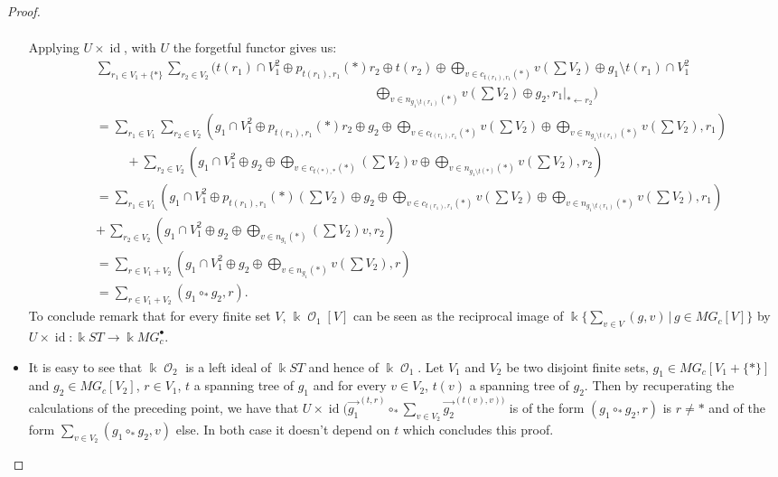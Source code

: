 \documentclass[a4paper]{article}
\DeclareMathOperator{\id}{id}
\DeclareMathOperator{\op}{\mathcal{O}}
\theoremstyle{definition}
\begin{document}
\begin{proof}
\begin{itemize}
\begin{align*}
\end{align*}
Applying $U\times\id$, with $U$ the forgetful functor gives us:
\begin{align*}
&\sum_{r_1\in V_1+\{\ast\}}\sum_{r_2\in V_2} (t(r_1)\cap V_1^2\oplus p_{t(r_1),r_1}(\ast)r_2\oplus t(r_2) \oplus \bigoplus_{v\in c_{t(r_1),r_1}(\ast)} v\left(\sum V_2\right) \oplus g_1\setminus t(r_1)\cap V_1^2\\
&\qquad\qquad\qquad\qquad\qquad\qquad\qquad\qquad\qquad\qquad\qquad\bigoplus_{v\in n_{g_1\setminus t(r_1)}(\ast)}v\left(\sum V_2\right)\oplus g_2, r_1|_{\ast\leftarrow r_2})\\
&= \sum_{r_1\in V_1}\sum_{r_2\in V_2} \left(g_1\cap V_1^2\oplus p_{t(r_1),r_1}(\ast)r_2\oplus g_2 \oplus \bigoplus_{v\in c_{t(r_1),r_1}(\ast)} v\left(\sum V_2\right)\oplus\bigoplus_{v\in n_{g_1\setminus t(r_1)}(\ast)}v\left(\sum V_2\right), r_1\right)\\
&\qquad\ \,+ \sum_{r_2\in V_2} \left(g_1\cap V_1^2\oplus g_2 \oplus \bigoplus_{v\in c_{t(\ast),\ast}(\ast)} \left(\sum V_2\right)v\oplus\bigoplus_{v\in n_{g_1\setminus t(\ast)}(\ast)}v\left(\sum V_2\right), r_2\right)\\
&= \sum_{r_1\in V_1} \left(g_1\cap V_1^2\oplus p_{t(r_1),r_1}(\ast)\left(\sum V_2\right)\oplus g_2 \oplus \bigoplus_{v\in c_{t(r_1),r_1}(\ast)} v\left(\sum V_2\right)\oplus\bigoplus_{v\in n_{g_1\setminus t(r_1)}(\ast)}v\left(\sum V_2\right), r_1\right)\\
&+\, \sum_{r_2\in V_2} \left(g_1\cap V_1^2\oplus g_2 \oplus \bigoplus_{v\in n_{g_1}(\ast)} \left(\sum V_2\right)v, r_2\right)\\
&=\sum_{r\in V_1+V_2} \left(g_1\cap V_1^2\oplus g_2 \oplus\bigoplus_{v\in n_{g_1}(\ast)} v\left(\sum V_2\right), r\right) \\
&= \sum_{r\in V_1+V_2} (g_1\circ_{\ast}g_2,r).
\end{align*}
To conclude remark that for every finite set $V$, $\Bbbk\op_1[V]$ can be seen as the reciprocal image of $\Bbbk\{\sum_{v\in V}(g,v)\,|\,g\in MG_c[V]\}$ by $U\times\id: \Bbbk ST\rightarrow \Bbbk MG_c^{\bullet}$.
\item It is easy to see that $\Bbbk\op_2$ is a left ideal of $\Bbbk ST$ and hence of $\Bbbk\op_1$. Let $V_1$ and $V_2$ be two disjoint finite sets, $g_1\in MG_c[V_1+\{\ast\}]$ and $g_2\in MG_c[V_2]$, $r\in V_1$, $t$ a spanning tree of $g_1$ and for every $v\in V_2$, $t(v)$ a spanning tree of $g_2$. Then by recuperating the calculations of the preceding point, we have that $U\times\id(\overrightarrow{g_1}^{(t,r)}\circ_{\ast}\sum_{v\in V_2} \overrightarrow{g_2}^{(t(v),v))}$ is of the form $(g_1\circ_{\ast} g_2, r)$ is $r\not = \ast$ and of the form $\sum_{v\in V_2} (g_1\circ_{\ast} g_2, v)$ else. In both case it doesn't depend on $t$ which concludes this proof.
\end{itemize}
\end{proof}
\end{document}
